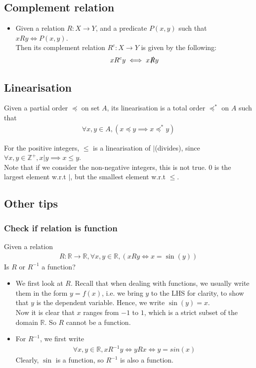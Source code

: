 \documentclass{article}
\begin{document}
\subsection{Complement relation}
\begin{itemize}
	\item Given a relation $R:X\rightarrow Y$, and a predicate $P(x,y)$ such that $xRy\iff P(x,y)$.\\
	Then its complement relation $R^c:X\rightarrow Y$ is given by the following: 
	\begin{align*}
		xR^cy \iff x\slashed{R}y
	\end{align*}
\end{itemize}

\subsection{Linearisation}
Given a partial order $\preceq$ on set $A$, its linearisation is a total order $\preceq^*$ on $A$ such that 
\begin{align*}
	\forall x,y\in A, (x\preceq y \implies x\preceq^* y)
\end{align*}

For the positive integers, $\leq$ is a linearisation of $|$(divides), since $\forall x,y\in \mathbb{Z}^+, x|y \implies x\leq y$. \\
Note that if we consider the non-negative integers, this is not true. $0$ is the largest element w.r.t $|$, but the smallest element w.r.t $\leq$.

\subsection{Other tips}
\subsubsection{Check if relation is function}
Given a relation 
\begin{align*}
	R:\mathbb{R}\rightarrow \mathbb{R}, \forall x,y\in \mathbb{R}, (xRy \iff x=\sin(y))
\end{align*}
Is $R$ or $R^{-1}$ a function?
\begin{itemize}
	\item We first look at $R$. Recall that when dealing with functions, we usually write them in the form $y=f(x)$, i.e. we bring $y$ to the LHS for clarity, to show that $y$ is the dependent variable. Hence, we write $\sin(y)=x$.\\
	Now it is clear that $x$ ranges from $-1$ to $1$, which is a strict subset of the domain $\mathbb{R}$. So $R$ cannot be a function.
	\item For $R^{-1}$, we first write 
	\begin{align*}
		\forall x,y\in \mathbb{R}, xR^{-1}y \iff yRx \iff y=sin(x)
	\end{align*}		
	Clearly, $\sin$ is a function, so $R^{-1}$ is also a function.
\end{itemize}
\end{document}
